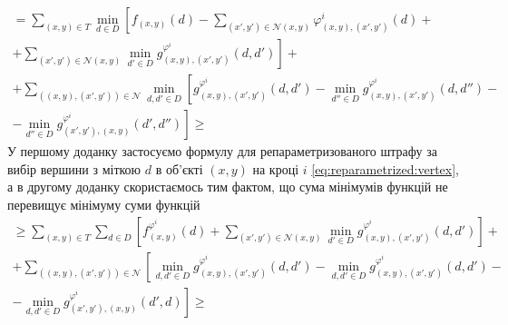 \begin{equation*}
\begin{gathered}
    = \sum \limits_{\left(x, y \right) \in T}
        \min \limits_{d \in D} \left[
            f_{\left(x, y \right)} \left( d \right) -
            \sum \limits_{\left(x', y' \right) \in \mathcal{N} \left(x, y \right)}
                \varphi_{\left(x, y \right), \left(x', y' \right)}^i
                    \left(d \right) + \right. \\
                \left. + \sum \limits_{\left(x', y' \right) \in \mathcal{N} \left(x, y \right)}
                \min \limits_{d' \in D}
                    g_{\left(x, y \right), \left(x', y' \right)}^{\varphi^i}
                        \left(d, d' \right)
        \right] + \\
    + \sum \limits_{\left(\left(x, y \right), \left(x', y' \right)\right)\in\mathcal{N}}
        \min \limits_{d,d' \in D} \left[
            g_{\left(x, y \right), \left(x', y' \right)}^{\varphi^i}
                \left(d, d' \right) -
            \min \limits_{d'' \in D}
                g_{\left(x, y \right), \left(x', y' \right)}^{\varphi^i}
                    \left(d, d'' \right) - \right. \\
            \left. - \min \limits_{d'' \in D}
                g_{\left(x', y' \right), \left(x, y \right)}^{\varphi^i}
                    \left(d', d'' \right)
        \right] \ge
\end{gathered}
\end{equation*}
У першому доданку
застосуємо формулу для репараметризованого штрафу за вибір вершини з міткою $d$
в об'єкті $\left(x, y \right)$ на кроці $i$ \eqref{eq:reparametrized:vertex},
а в другому доданку скористаємось тим фактом,
що сума мінімумів функцій не перевищує мінімуму суми функцій
\begin{equation*}
\begin{gathered}
    \ge \sum \limits_{\left(x, y \right) \in T}
        \sum \limits_{d \in D} \left[
            f_{\left(x, y \right)}^{\varphi^i} \left(d \right) +
            \sum \limits_{\left(x', y' \right) \in \mathcal{N} \left(x, y \right)}
                \min \limits_{d' \in D}
                    g_{\left(x, y \right), \left(x', y' \right)}^{\varphi^i}
                        \left(d, d' \right)
        \right] + \\
    + \sum \limits_{\left(\left(x, y \right), \left(x', y' \right) \right)\in \mathcal{N}}
    \left[
        \min\limits_{d, d' \in D}
            g_{\left(x, y \right), \left(x', y' \right)}^{\varphi^i}
                \left(d, d' \right) -
        \min\limits_{d, d' \in D}
            g_{\left(x, y \right), \left(x', y' \right)}^{\varphi^i}
                \left(d, d' \right) - \right. \\
        \left. - \min\limits_{d, d' \in D}
            g_{\left(x', y' \right), \left(x, y \right)}^{\varphi^i}
                \left(d', d \right)
    \right] \ge
\end{gathered}
\end{equation*}

